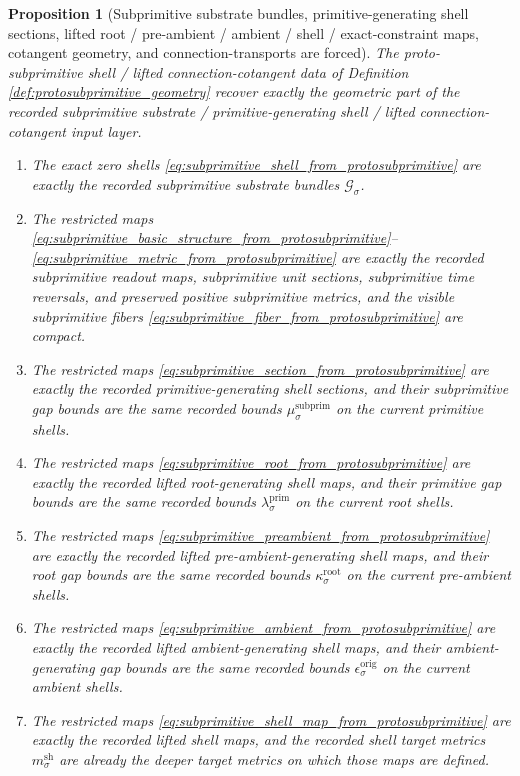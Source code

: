 \documentclass[11pt]{article}
\newcommand{\ShellMetric}[1]{m_{#1}^{\mathrm{sh}}}
\newcommand{\OriginGap}[1]{\epsilon_{#1}^{\mathrm{orig}}}
\newcommand{\RootGap}[1]{\kappa_{#1}^{\mathrm{root}}}
\newcommand{\PrimGap}[1]{\lambda_{#1}^{\mathrm{prim}}}
\newcommand{\SubprimGap}[1]{\mu_{#1}^{\mathrm{subprim}}}
\newcommand{\SubprimSpace}[1]{\mathcal G_{#1}}
\newtheorem{proposition}{Proposition}
\begin{document}
\begin{proposition}[Subprimitive substrate bundles, primitive-generating shell sections, lifted root / pre-ambient / ambient / shell / exact-constraint maps, cotangent geometry, and connection-transports are forced]
\label{prop:subprimitive_geometry_forced}
The proto-subprimitive shell / lifted connection-cotangent data of Definition \ref{def:protosubprimitive_geometry} recover exactly the geometric part of the recorded subprimitive substrate / primitive-generating shell / lifted connection-cotangent input layer.
\begin{enumerate}
    \item The exact zero shells \eqref{eq:subprimitive_shell_from_protosubprimitive} are exactly the recorded subprimitive substrate bundles \(\SubprimSpace{\sigma}\).
    \item The restricted maps \eqref{eq:subprimitive_basic_structure_from_protosubprimitive}--\eqref{eq:subprimitive_metric_from_protosubprimitive} are exactly the recorded subprimitive readout maps, subprimitive unit sections, subprimitive time reversals, and preserved positive subprimitive metrics, and the visible subprimitive fibers \eqref{eq:subprimitive_fiber_from_protosubprimitive} are compact.
    \item The restricted maps \eqref{eq:subprimitive_section_from_protosubprimitive} are exactly the recorded primitive-generating shell sections, and their subprimitive gap bounds are the same recorded bounds \(\SubprimGap{\sigma}\) on the current primitive shells.
    \item The restricted maps \eqref{eq:subprimitive_root_from_protosubprimitive} are exactly the recorded lifted root-generating shell maps, and their primitive gap bounds are the same recorded bounds \(\PrimGap{\sigma}\) on the current root shells.
    \item The restricted maps \eqref{eq:subprimitive_preambient_from_protosubprimitive} are exactly the recorded lifted pre-ambient-generating shell maps, and their root gap bounds are the same recorded bounds \(\RootGap{\sigma}\) on the current pre-ambient shells.
    \item The restricted maps \eqref{eq:subprimitive_ambient_from_protosubprimitive} are exactly the recorded lifted ambient-generating shell maps, and their ambient-generating gap bounds are the same recorded bounds \(\OriginGap{\sigma}\) on the current ambient shells.
    \item The restricted maps \eqref{eq:subprimitive_shell_map_from_protosubprimitive} are exactly the recorded lifted shell maps, and the recorded shell target metrics \(\ShellMetric{\sigma}\) are already the deeper target metrics on which those maps are defined.

\end{enumerate}
\end{proposition}
\end{document}
